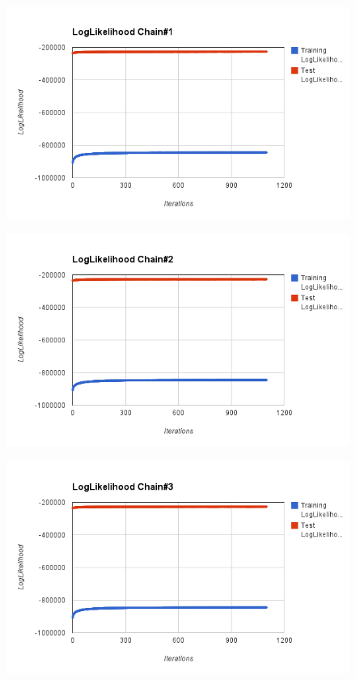 \documentclass[12pt]{article}
\begin{document}
\begin{figure}[H]
\centering
\includegraphics[keepaspectratio=true,scale=0.8]{charts/chain1}
\label{chain1}
\end{figure}

\begin{figure}[H]
\centering
\includegraphics[keepaspectratio=true,scale=0.8]{charts/chain2}
\label{chain2}
\end{figure}

\begin{figure}[H]
\centering
\includegraphics[keepaspectratio=true,scale=0.8]{charts/chain3}
\label{chain3}
\end{figure}
\end{document}
